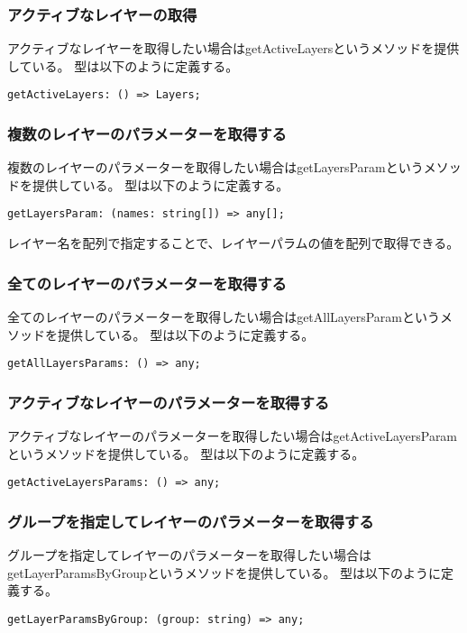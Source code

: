 \documentclass{jsarticle}
\begin{document}
\subsubsection{アクティブなレイヤーの取得}
アクティブなレイヤーを取得したい場合はgetActiveLayersというメソッドを提供している。
型は以下のように定義する。
\begin{lstlisting}[caption=getActiveLayersの型]
getActiveLayers: () => Layers;
\end{lstlisting}

\subsubsection{複数のレイヤーのパラメーターを取得する}
複数のレイヤーのパラメーターを取得したい場合はgetLayersParamというメソッドを提供している。
型は以下のように定義する。
\begin{lstlisting}[caption=getLayersParamの型]
getLayersParam: (names: string[]) => any[];
\end{lstlisting}
レイヤー名を配列で指定することで、レイヤーパラムの値を配列で取得できる。

\subsubsection{全てのレイヤーのパラメーターを取得する}
全てのレイヤーのパラメーターを取得したい場合はgetAllLayersParamというメソッドを提供している。
型は以下のように定義する。
\begin{lstlisting}[caption=getAllLayersParamの型]
getAllLayersParams: () => any;
\end{lstlisting}

\subsubsection{アクティブなレイヤーのパラメーターを取得する}
アクティブなレイヤーのパラメーターを取得したい場合はgetActiveLayersParamというメソッドを提供している。
型は以下のように定義する。
\begin{lstlisting}[caption=getActiveLayersParamの型]
getActiveLayersParams: () => any;
\end{lstlisting}

\subsubsection{グループを指定してレイヤーのパラメーターを取得する}
グループを指定してレイヤーのパラメーターを取得したい場合はgetLayerParamsByGroupというメソッドを提供している。
型は以下のように定義する。
\begin{lstlisting}[caption=getLayerParamsByGroupの型]
getLayerParamsByGroup: (group: string) => any;
\end{lstlisting}
\end{document}
